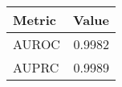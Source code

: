 \begin{tabular}{l r}
\hline
Metric & Value \\ \hline
AUROC & 0.9982 \\ 
AUPRC & 0.9989 \\ \hline
\end{tabular}
